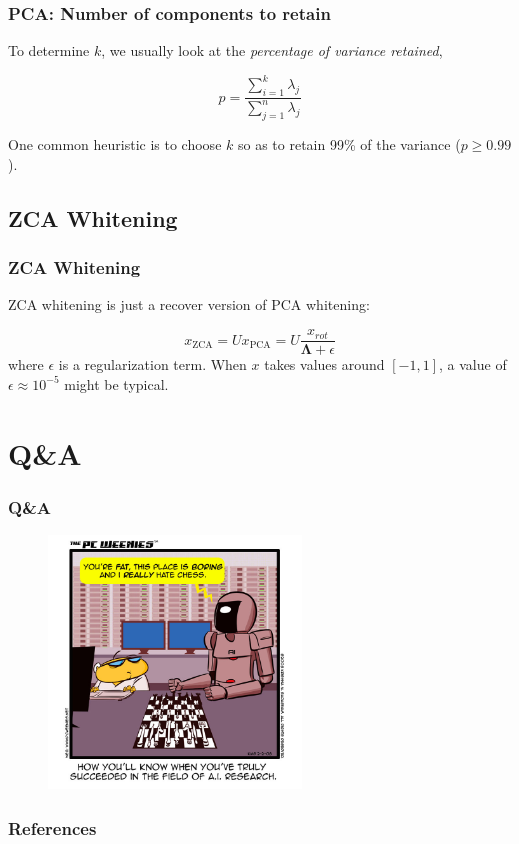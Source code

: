 \documentclass{beamer}
\begin{document}
\begin{frame}
  \frametitle{PCA: Number of components to retain}

  To determine $k$, we usually look at the \emph{percentage of variance retained},

  \begin{equation}
    p=\frac{\sum_{i=1}^{k}\lambda_{j}}{\sum_{j=1}^{n}\lambda_{j}}
  \end{equation}

  One common heuristic is to choose $k$ so as to retain 99\% of the variance ($p\geq 0.99$).
\end{frame}

\subsection{ZCA Whitening}

\begin{frame}
    \frametitle{ZCA Whitening}

    ZCA whitening is just a recover version of PCA whitening:

    \begin{equation*}
      x_{\text{ZCA}}=Ux_{\text{PCA}}=U\frac{x_{rot}}{\bm{\Lambda}+\epsilon}
    \end{equation*}
    where $\epsilon$ is a regularization term. When $x$ takes values around $[-1, 1]$, a value of $\epsilon\approx 10^{-5}$ might be typical.
\end{frame}

\section{Q\&A}

\begin{frame}
  \frametitle{Q\&A}
  
  \begin{figure}
    \includegraphics[width=0.6\textwidth]{ai_jokes.jpg}
  \end{figure}
\end{frame}

\begin{frame}
  \frametitle{References}
  \footnotesize
  
  
\end{frame}
\end{document}
